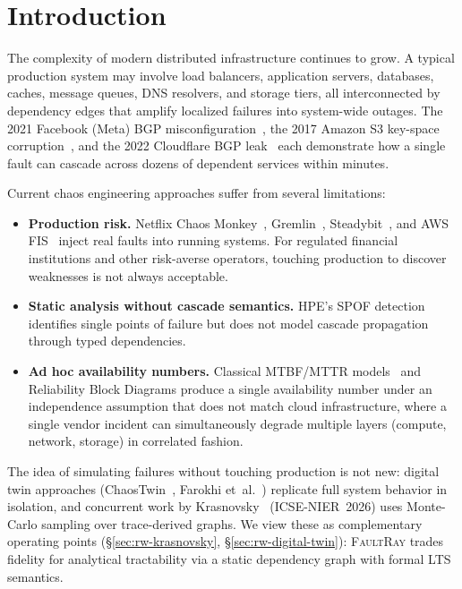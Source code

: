 \documentclass[10pt,twocolumn]{article}
\begin{document}
\section{Introduction}\label{sec:intro}

The complexity of modern distributed infrastructure continues to grow.
A typical production system may involve load balancers, application
servers, databases, caches, message queues, DNS resolvers, and storage
tiers, all interconnected by dependency edges that amplify localized
failures into system-wide outages.  The 2021 Facebook (Meta) BGP
misconfiguration~\cite{meta2021}, the 2017 Amazon S3 key-space
corruption~\cite{aws-s3-2017}, and the 2022 Cloudflare BGP
leak~\cite{cloudflare2022} each demonstrate how a single fault can
cascade across dozens of dependent services within minutes.

Current chaos engineering approaches suffer from several limitations:
\begin{itemize}[nosep]
\item \textbf{Production risk.} Netflix Chaos Monkey~\cite{basiri2016},
  Gremlin~\cite{gremlin2020}, Steadybit~\cite{steadybit2023}, and
  AWS FIS~\cite{aws-fis} inject real faults into running systems. For
  regulated financial institutions and other risk-averse operators,
  touching production to discover weaknesses is not always acceptable.
\item \textbf{Static analysis without cascade semantics.}
  HPE's SPOF detection~\cite{hpe-spof} identifies single points of
  failure but does not model cascade propagation through typed
  dependencies.
\item \textbf{Ad hoc availability numbers.} Classical MTBF/MTTR
  models~\cite{trivedi2001} and Reliability Block Diagrams produce
  a single availability number under an independence assumption that
  does not match cloud infrastructure, where a single vendor incident
  can simultaneously degrade multiple layers (compute, network,
  storage) in correlated fashion.
\end{itemize}

The idea of simulating failures without touching production is not
new: digital twin approaches (ChaosTwin~\cite{chaostwin2021},
Farokhi et~al.~\cite{farokhi2024}) replicate full system behavior
in isolation, and concurrent work by
Krasnovsky~\cite{krasnovsky2026} (ICSE-NIER~2026) uses Monte-Carlo
sampling over trace-derived graphs. We view these as complementary
operating points (\S\ref{sec:rw-krasnovsky}, \S\ref{sec:rw-digital-twin}):
\textsc{FaultRay} trades fidelity for analytical tractability via
a static dependency graph with formal LTS semantics.
\end{document}
